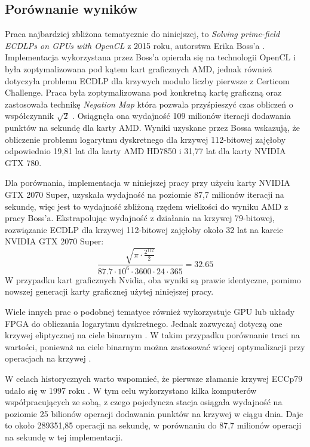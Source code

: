 \subsection{Porównanie wyników}
Praca najbardziej zbliżona tematycznie do niniejszej, to \textit{Solving prime-field
    ECDLPs on GPUs with OpenCL} z 2015 roku, autorstwa Erika Boss'a \cite{Boss2015}.
Implementacja wykorzystana przez Boss'a opierała się na technologii
OpenCL i była zoptymalizowana pod kątem kart graficznych AMD, jednak również
dotyczyła problemu ECDLP dla krzywych modulo liczby pierwsze z Certicom Challenge.
Praca była zoptymalizowana pod konkretną kartę graficzną
oraz zastosowała technikę \textit{Negation Map} która pozwala przyśpieszyć czas obliczeń
o współczynnik $\sqrt{2}$ \cite{Negation}.
Osiągnęła ona wydajność 109 milionów iteracji dodawania punktów na sekundę dla karty AMD.
Wyniki uzyskane przez Bossa wskazują, że obliczenie
problemu logarytmu dyskretnego dla krzywej 112-bitowej zajęłoby odpowiednio 19,81
lat dla karty AMD HD7850 i 31,77 lat dla karty NVIDIA GTX 780.

Dla porównania, implementacja w niniejszej pracy przy użyciu karty NVIDIA GTX 2070
Super, uzyskała wydajność na poziomie 87,7 milionów iteracji na sekundę,
więc jest to wydajność zbliżoną rzędem wielkości do wyniku AMD z pracy Boss'a.
Ekstrapolując wydajność z działania na krzywej 79-bitowej,
rozwiązanie ECDLP dla krzywej 112-bitowej zajęłoby około 32 lat na karcie NVIDIA GTX 2070 Super:
$$
    \frac{\sqrt{\pi \cdot \frac{2^{112}}{2}}}{87.7 \cdot 10^{6} \cdot 3600 \cdot 24 \cdot 365} = 32.65
$$
W przypadku kart graficznych Nvidia, oba wyniki są prawie identyczne,
pomimo nowszej generacji karty graficznej użytej niniejszej pracy.

Wiele innych prac o podobnej tematyce również wykorzystuje GPU lub układy FPGA do
obliczania logarytmu dyskretnego. Jednak zazwyczaj dotyczą one krzywej
eliptycznej na ciele binarnym \cite{Wenger2014,FPGA2008,Majkowski2008}. W
takim przypadku porównanie traci na wartości, ponieważ na ciele binarnym
można zastosować więcej optymalizacji przy operacjach na krzywej \cite{Blake2005}.

W celach historycznych warto wspomnieć, że pierwsze złamanie krzywej ECCp79
udało się w 1997 roku \cite{certicom-cracked}. W tym celu wykorzystano kilka komputerów
współpracujących ze sobą, z czego pojedyncza stacja osiągała wydajność na
poziomie 25 bilionów operacji dodawania punktów na krzywej w ciągu dnia. Daje to około 289351,85 operacji na
sekundę, w porównaniu do 87,7 milionów operacji na sekundę w tej
implementacji.